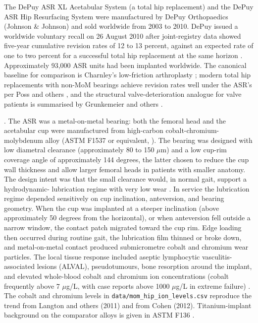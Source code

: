 The DePuy ASR XL Acetabular System (a total hip replacement) and
the DePuy ASR Hip Resurfacing System were manufactured by DePuy
Orthopaedics (Johnson \& Johnson) and sold worldwide from 2003 to
2010. DePuy issued a worldwide voluntary recall on 26 August 2010
after joint-registry data showed five-year cumulative revision
rates of 12 to 13 percent, against an expected rate of one to two
percent for a successful total hip replacement at the same horizon
\cite{acc:depuy-asr-hip-2010,
web:v6c12-fda-depuy-asr-2010-recall, paper:v6c12-cohen-mom-bmj-2012,
paper:v6c12-langton-asr-2011, paper:v6c12-smith-asr-revision-2012}.
Approximately 93,000 ASR units had been implanted worldwide. The
canonical baseline for comparison is Charnley's low-friction
arthroplasty \cite{paper:v6c12-charnley-low-friction-1972}; modern
total hip replacements with non-MoM bearings achieve revision
rates well under the ASR's per Poss and others
\cite{paper:v6c12-poss-hip-survival-2018}, and the structural
valve-deterioration analogue for valve patients is summarised by
Grunkemeier and others
\cite{paper:v6c12-grunkemeier-bioprosthetic-svd-2017}.

. The ASR was a metal-on-metal
bearing: both the femoral head and the acetabular cup were
manufactured from high-carbon cobalt-chromium-molybdenum alloy
(ASTM F1537 or equivalent, \cite{std:v6c12-astm-f1537-2020,
std:v6c12-astm-f75-2018}). The bearing was designed with low
diametral clearance (approximately 80 to 150 $\mu$m) and a low
cup-rim coverage angle of approximately 144 degrees, the latter
chosen to reduce the cup wall thickness and allow larger femoral
heads in patients with smaller anatomy. The design intent was that
the small clearance would, in normal gait, support a hydrodynamic-
lubrication regime with very low wear
\cite{paper:v6c12-langton-asr-2011}. In service the lubrication
regime depended sensitively on cup inclination, anteversion, and
bearing geometry. When the cup was implanted at a steeper
inclination (above approximately 50 degrees from the horizontal),
or when anteversion fell outside a narrow window, the contact patch
migrated toward the cup rim. Edge loading then occurred during
routine gait, the lubrication film thinned or broke down, and
metal-on-metal contact produced submicrometre cobalt and chromium
wear particles. The local tissue response included aseptic
lymphocytic vasculitis-associated lesions (ALVAL), pseudotumours,
bone resorption around the implant, and elevated whole-blood
cobalt and chromium ion concentrations (cobalt frequently above
7 $\mu$g/L, with case reports above 1000 $\mu$g/L in extreme
failure) \cite{paper:v6c12-cohen-mom-bmj-2012,
paper:v6c12-jacobs-metal-ions-2003}. The cobalt and chromium
levels in \texttt{data/mom\_hip\_ion\_levels.csv} reproduce the
trend from Langton and others (2011) and from Cohen (2012).
Titanium-implant background on the comparator alloys is given in
ASTM F136 \cite{std:v6c12-astm-f136-2013}.

